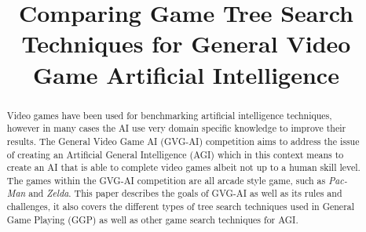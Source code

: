 \documentclass[journal]{IEEEtran}
\begin{document}
%
\title{Comparing Game Tree Search Techniques for General Video Game Artificial Intelligence}
%
%
\author{
}


\maketitle

\begin{abstract}
	Video games have been used for benchmarking artificial intelligence techniques, however in many cases the AI use very domain specific knowledge to improve their results. 
	The General Video Game AI (GVG-AI) competition aims to address the issue of creating an Artificial General Intelligence (AGI) which in this context means to create an AI that is able to complete video games albeit not up to a human skill level. The games within the GVG-AI competition are all arcade style game, such as \textit{Pac-Man} and \textit{Zelda}. 
	This paper describes the goals of GVG-AI as well as its rules and challenges, it also covers the different types of tree search techniques used in General Game Playing (GGP) as well as other game search techniques for AGI.
	
\end{abstract}
\end{document}
